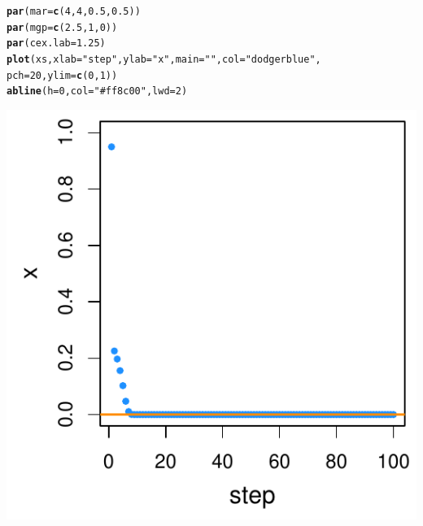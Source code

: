 \documentclass[a4paper]{article}\usepackage[]{graphicx}\usepackage[]{color}
\makeatletter
\def\maxwidth{ %
  \ifdim\Gin@nat@width>\linewidth
    \linewidth
  \else
    \Gin@nat@width
  \fi
}
\newcommand{\hlnum}[1]{\textcolor[rgb]{0.686,0.059,0.569}{#1}}%
\newcommand{\hlstr}[1]{\textcolor[rgb]{0.192,0.494,0.8}{#1}}%
\newcommand{\hlstd}[1]{\textcolor[rgb]{0.345,0.345,0.345}{#1}}%
\newcommand{\hlkwc}[1]{\textcolor[rgb]{0.333,0.667,0.333}{#1}}%
\newcommand{\hlkwd}[1]{\textcolor[rgb]{0.737,0.353,0.396}{\textbf{#1}}}%
\newenvironment{kframe}{%
 \def\at@end@of@kframe{}%
 \ifinner\ifhmode%
  \def\at@end@of@kframe{\end{minipage}}%
  \begin{minipage}{\columnwidth}%
 \fi\fi%
 \def\FrameCommand##1{\hskip\@totalleftmargin \hskip-\fboxsep
 \colorbox{shadecolor}{##1}\hskip-\fboxsep
     \hskip-\linewidth \hskip-\@totalleftmargin \hskip\columnwidth}%
 \MakeFramed {\advance\hsize-\width
   \@totalleftmargin\z@ \linewidth\hsize
   \@setminipage}}%
 {\par\unskip\endMakeFramed%
 \at@end@of@kframe}
\newenvironment{knitrout}{}{} %
\makeatother
\begin{document}
\begin{knitrout}
\color{fgcolor}\begin{kframe}
\begin{alltt}
\hlkwd{par}\hlstd{(}\hlkwc{mar} \hlstd{=} \hlkwd{c}\hlstd{(}\hlnum{4}\hlstd{,} \hlnum{4}\hlstd{,} \hlnum{0.5}\hlstd{,} \hlnum{0.5}\hlstd{))}
\hlkwd{par}\hlstd{(}\hlkwc{mgp} \hlstd{=} \hlkwd{c}\hlstd{(}\hlnum{2.5}\hlstd{,} \hlnum{1}\hlstd{,} \hlnum{0}\hlstd{))}
\hlkwd{par}\hlstd{(}\hlkwc{cex.lab} \hlstd{=} \hlnum{1.25}\hlstd{)}
\hlkwd{plot}\hlstd{(xs,} \hlkwc{xlab} \hlstd{=} \hlstr{"step"}\hlstd{,} \hlkwc{ylab} \hlstd{=} \hlstr{"x"}\hlstd{,} \hlkwc{main} \hlstd{=} \hlstr{""}\hlstd{,} \hlkwc{col} \hlstd{=} \hlstr{"dodgerblue"}\hlstd{,}
    \hlkwc{pch} \hlstd{=} \hlnum{20}\hlstd{,} \hlkwc{ylim} \hlstd{=} \hlkwd{c}\hlstd{(}\hlnum{0}\hlstd{,} \hlnum{1}\hlstd{))}
\hlkwd{abline}\hlstd{(}\hlkwc{h} \hlstd{=} \hlnum{0}\hlstd{,} \hlkwc{col} \hlstd{=} \hlstr{"#ff8c00"}\hlstd{,} \hlkwc{lwd} \hlstd{=} \hlnum{2}\hlstd{)}
\end{alltt}
\end{kframe}

{\centering \includegraphics[width=\maxwidth]{figure/minimal-unnamed-chunk-2-1} 

}



\end{knitrout}
\end{document}
